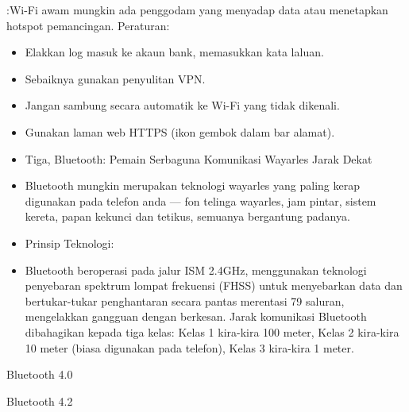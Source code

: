 
:Wi-Fi awam mungkin ada penggodam yang menyadap data atau menetapkan hotspot pemancingan. Peraturan:

\begin{itemize}
  \item Elakkan log masuk ke akaun bank, memasukkan kata laluan.
  \item Sebaiknya gunakan penyulitan VPN.
  \item Jangan sambung secara automatik ke Wi-Fi yang tidak dikenali.
  \item Gunakan laman web HTTPS (ikon gembok dalam bar alamat).
\end{itemize}

\begin{itemize}
  \item Tiga, Bluetooth: Pemain Serbaguna Komunikasi Wayarles Jarak Dekat
  \item Bluetooth mungkin merupakan teknologi wayarles yang paling kerap digunakan pada telefon anda — fon telinga wayarles, jam pintar, sistem kereta, papan kekunci dan tetikus, semuanya bergantung padanya.
  \item Prinsip Teknologi:
  \item Bluetooth beroperasi pada jalur ISM 2.4GHz, menggunakan teknologi penyebaran spektrum lompat frekuensi (FHSS) untuk menyebarkan data dan bertukar-tukar penghantaran secara pantas merentasi 79 saluran, mengelakkan gangguan dengan berkesan. Jarak komunikasi Bluetooth dibahagikan kepada tiga kelas: Kelas 1 kira-kira 100 meter, Kelas 2 kira-kira 10 meter (biasa digunakan pada telefon), Kelas 3 kira-kira 1 meter.
\end{itemize}


Bluetooth 4.0


Bluetooth 4.2



